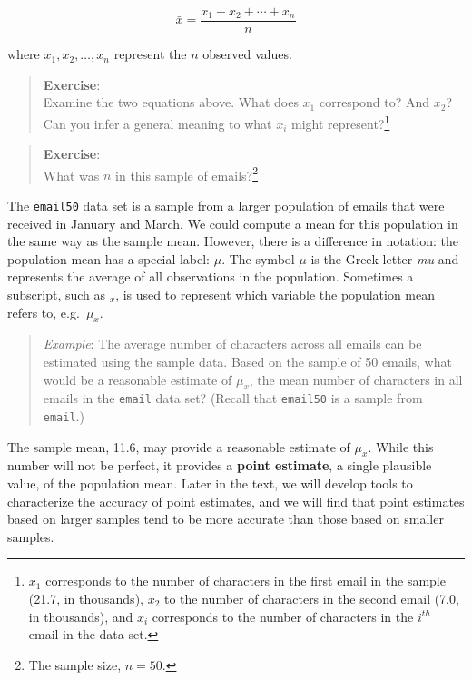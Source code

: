 \documentclass[
  letterpaper,
  DIV=11,
  numbers=noendperiod]{scrreprt}
\begin{document}
\begin{equation} 
  \bar{x} = \frac{x_1+x_2+\cdots+x_n}{n}
  \tag{1}
\end{equation}

where \(x_1, x_2, \dots, x_n\) represent the \(n\) observed values.

\begin{quote}
\textbf{Exercise}:\\
Examine the two equations above. What does \(x_1\) correspond to? And
\(x_2\)? Can you infer a general meaning to what \(x_i\) might
represent?\footnote{\(x_1\) corresponds to the number of characters in
  the first email in the sample (21.7, in thousands), \(x_2\) to the
  number of characters in the second email (7.0, in thousands), and
  \(x_i\) corresponds to the number of characters in the \(i^{th}\)
  email in the data set.}
\end{quote}

\begin{quote}
\textbf{Exercise}:\\
What was \(n\) in this sample of emails?\footnote{The sample size,
  \(n = 50\).}
\end{quote}

The \texttt{email50} data set is a sample from a larger population of
emails that were received in January and March. We could compute a mean
for this population in the same way as the sample mean. However, there
is a difference in notation: the population mean has a special label:
\(\mu\). The symbol \(\mu\) is the Greek letter \emph{mu} and represents
the average of all observations in the population. Sometimes a
subscript, such as \(_x\), is used to represent which variable the
population mean refers to, e.g.~\(\mu_x\).

\begin{quote}
\emph{Example}: The average number of characters across all emails can
be estimated using the sample data. Based on the sample of 50 emails,
what would be a reasonable estimate of \(\mu_x\), the mean number of
characters in all emails in the \texttt{email} data set? (Recall that
\texttt{email50} is a sample from \texttt{email}.)
\end{quote}

The sample mean, 11.6, may provide a reasonable estimate of \(\mu_x\).
While this number will not be perfect, it provides a \textbf{point
estimate}, a single plausible value, of the population mean. Later in
the text, we will develop tools to characterize the accuracy of point
estimates, and we will find that point estimates based on larger samples
tend to be more accurate than those based on smaller samples.
\end{document}
